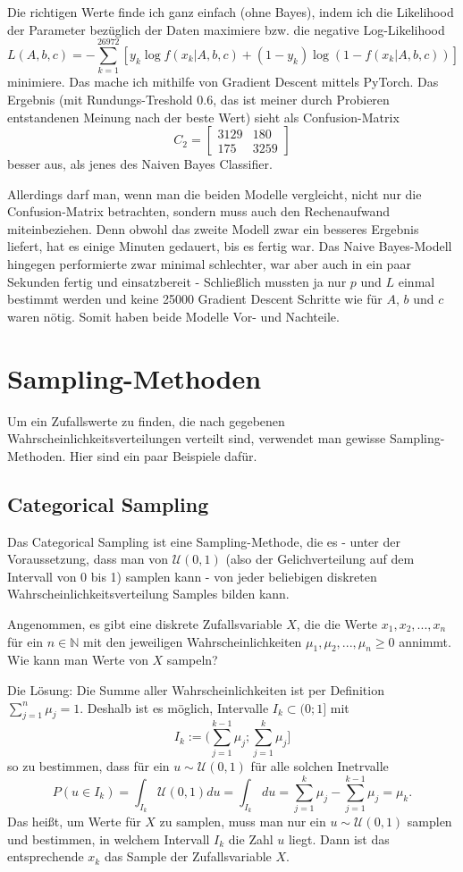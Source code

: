 \documentclass{article}
\begin{document}
Die richtigen Werte finde ich ganz einfach (ohne Bayes), indem ich die Likelihood der Parameter bezüglich der Daten maximiere bzw. die negative Log-Likelihood\[
    L(A,b,c)=-\sum\limits_{k=1}^{26972}[y_k\log f(x_k|A,b,c)+(1-y_k)\log(1-f(x_k|A,b,c))]
\]minimiere. Das mache ich mithilfe von Gradient Descent mittels PyTorch.
Das Ergebnis (mit Rundungs-Treshold 0.6, das ist meiner durch Probieren entstandenen Meinung nach der beste Wert) sieht als Confusion-Matrix \[
C_2=\begin{bmatrix}
    3129&180\\175&3259
\end{bmatrix}
\]besser aus, als jenes des Naiven Bayes Classifier.

Allerdings darf man, wenn man die beiden Modelle vergleicht, nicht nur die Confusion-Matrix betrachten, sondern muss auch den Rechenaufwand miteinbeziehen. Denn obwohl das zweite Modell zwar ein besseres Ergebnis liefert, hat es einige Minuten gedauert, bis es fertig war. Das Naive Bayes-Modell hingegen performierte zwar minimal schlechter, war aber auch in ein paar Sekunden fertig und einsatzbereit - Schließlich mussten ja nur \(p\) und \(L\) einmal bestimmt werden und keine 25000 Gradient Descent Schritte wie für \(A\), \(b\) und \(c\) waren nötig. Somit haben beide Modelle Vor- und Nachteile.

\section{Sampling-Methoden}
Um ein Zufallswerte zu finden, die nach gegebenen Wahrscheinlichkeitsverteilungen verteilt sind, verwendet man gewisse Sampling-Methoden. Hier sind ein paar Beispiele dafür.

\subsection{Categorical Sampling}
Das Categorical Sampling ist eine Sampling-Methode, die es - unter der Voraussetzung, dass man von \(\mathcal U(0,1)\) (also der Gelichverteilung auf dem Intervall von 0 bis 1) samplen kann - von jeder beliebigen diskreten Wahrscheinlichkeitsverteilung Samples bilden kann.

Angenommen, es gibt eine diskrete Zufallsvariable \(X\), die die Werte \(x_1,x_2,...,x_n\) für ein \(n\in\mathbb N\) mit den jeweiligen Wahrscheinlichkeiten \(\mu_1,\mu_2,...,\mu_n\geq0\) annimmt. Wie kann man Werte von \(X\) sampeln? 

Die Lösung: Die Summe aller Wahrscheinlichkeiten ist per Definition \(\sum_{j=1}^n\mu_j=1\). Deshalb ist es möglich, Intervalle \(I_k\subset(0;1]\) mit \[
I_k:=(\sum_{j=1}^{k-1}\mu_j; \sum_{j=1}^k\mu_j]
\] so zu bestimmen, dass für ein \(u\sim\mathcal U(0,1)\) für alle solchen Inetrvalle\[
    P(u\in I_k)=\int_{I_k}\mathcal U(0,1)du=\int_{I_k}du=\sum_{j=1}^k\mu_j-\sum_{j=1}^{k-1}\mu_j=\mu_k.
\]Das heißt, um Werte für \(X\) zu samplen, muss man nur ein \(u\sim\mathcal U(0,1)\) samplen und bestimmen, in welchem Intervall \(I_k\) die Zahl \(u\) liegt. Dann ist das entsprechende \(x_k\) das Sample der Zufallsvariable \(X\). 
\end{document}
